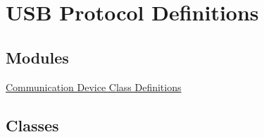\hypertarget{group__usb__protocol__group}{}\section{U\+SB Protocol Definitions}
\label{group__usb__protocol__group}
\subsection*{Modules}
\begin{DoxyCompactItemize}
\item 
\hyperlink{group__cdc__protocol__group}{Communication Device Class Definitions}
\end{DoxyCompactItemize}
\subsection*{Classes}
